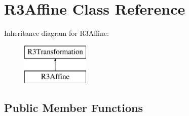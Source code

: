 \hypertarget{class_r3_affine}{}\section{R3\+Affine Class Reference}
\label{class_r3_affine}
Inheritance diagram for R3\+Affine\+:\begin{figure}[H]
\begin{center}
\leavevmode
\includegraphics[height=2.000000cm]{class_r3_affine}
\end{center}
\end{figure}
\subsection*{Public Member Functions}
